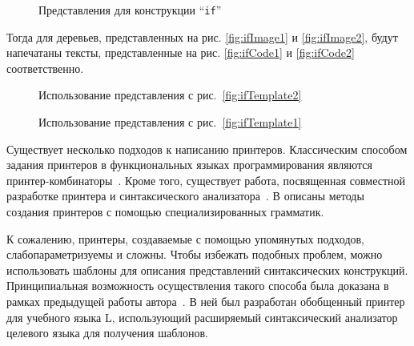 \begin{figure}[h!]
	\subfloat[]{
		
		\label{fig:ifTemplate2}	
	}
	\quad
	\subfloat[]{
		
		\label{fig:ifTemplate1}	
	}
	\caption{Представления для конструкции “\lstinline{if}”}
\end{figure}


Тогда для деревьев, представленных на рис.
\ref{fig:ifImage1} и \ref{fig:ifImage2}, будут напечатаны тексты, представленные на
рис. \ref{fig:ifCode1} и \ref{fig:ifCode2} соответственно.

\begin{figure}[h!]
	\subfloat[]{
		\centering
		\texttt{[image: if1]}
		\label{fig:ifImage1}
	}
	\quad
	\subfloat[]{
		\centering
		
		\label{fig:ifCode1}	
	}

	\caption{Использование представления с рис.~\ref{fig:ifTemplate2}}
\end{figure}

\begin{figure}[h!]
	\subfloat[]{
		\centering
		\texttt{[image: if2]}
		\label{fig:ifImage2}
	}
	\quad
	\subfloat[]{
		\centering
		
		\label{fig:ifCode2}	
	}

	\caption{Использование представления с рис.~\ref{fig:ifTemplate1}}
\end{figure}

Существует несколько подходов к написанию принтеров.
Классическим способом задания принтеров в функциональных языках
программирования являются
принтер-комбинаторы~\cite{wadler, swierstra, swierstraChitil,
swierstra04, hughes, peytonJones, kiselyov, chitil, swiComb}.
Кроме того, существует работа, посвященная совместной разработке
принтера и синтаксического анализатора~\cite{rendelInvert}.
В \cite{jongeEveryOccasion, jongeReengine, brandBox} описаны методы
создания принтеров с помощью специализированных грамматик.

К сожалению, принтеры, создаваемые с помощью упомянутых подходов,
слабопараметризуемы и сложны. Чтобы избежать подобных проблем,
можно использовать шаблоны для описания представлений синтаксических
конструкций. Принципиальная возможность осуществления такого способа была
доказана в рамках предыдущей работы
автора~\cite{myCoursePaper}. В ней был разработан
обобщенный принтер для учебного языка L, использующий расширяемый
синтаксический анализатор целевого языка для получения шаблонов.

